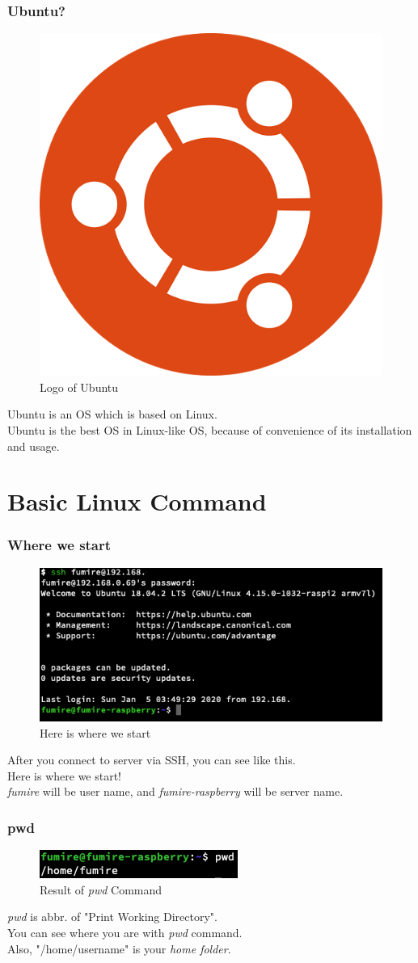 \documentclass{beamer}
\begin{document}
	\begin{frame}
		\frametitle{Ubuntu?}
		\begin{figure}[h!]
			\centering
			\includegraphics[width=0.3 \linewidth]{figures/ubuntu.jpg}
			\caption{Logo of Ubuntu}
		\end{figure}
		Ubuntu is an OS which is based on Linux. \\
		Ubuntu is the best OS in Linux-like OS, because of convenience of its installation and usage.
	\end{frame}
	
	\section{Basic Linux Command}
	
	\begin{frame}
		\frametitle{Where we start}
		\begin{figure}[h!]
			\centering
			\includegraphics[width=0.5 \linewidth]{figures/1.png}
			\caption{Here is where we start}
		\end{figure}
	
		After you connect to server via SSH, you can see like this. \\
		Here is where we start! \\
		\textit{fumire} will be user name, and \textit{fumire-raspberry} will be server name. 
	\end{frame}

	\begin{frame}
		\frametitle{pwd}
		\begin{figure}[h!]
			\centering
			\includegraphics[width=0.5 \linewidth]{figures/2.png}
			\caption{Result of \textit{pwd} Command}
		\end{figure}
		\textit{pwd} is abbr. of "Print Working Directory". \\
		You can see where you are with \textit{pwd} command. \\
		Also, "/home/username" is your \textit{home folder}.
	\end{frame}
\end{document}
